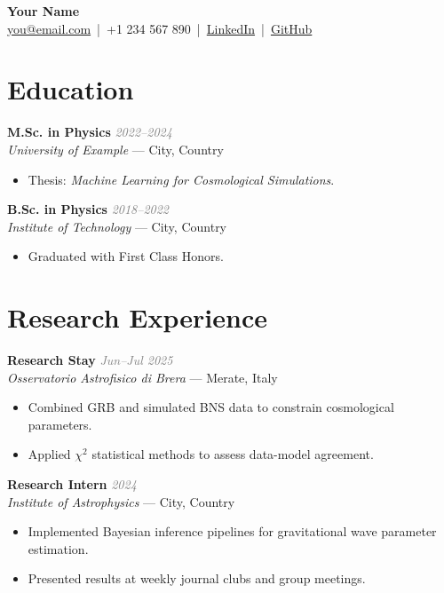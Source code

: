 \documentclass[a4paper,11pt]{article}
\newcommand{\dated}[1]{\textcolor{gray}{\textit{#1}}}
\newcommand{\resumeSubheading}[4]{
  \vspace{1pt}\textbf{#1} \hfill \dated{#2} \\
  \textit{#3} --- #4 \vspace{2pt}
}
\newenvironment{resumeItemList}{\begin{itemize}[leftmargin=*]}{\end{itemize}}
\begin{document}
\begin{center}
  {\Huge \textbf{Your Name}} \\[4pt]
  \href{mailto:you@email.com}{you@email.com} \,|\, 
  +1 234 567 890 \,|\, 
  \href{https://linkedin.com/in/username}{LinkedIn} \,|\, 
  \href{https://github.com/username}{GitHub} \\
\end{center}

\section{Education}
\resumeSubheading{M.Sc. in Physics}{2022--2024}{University of Example}{City, Country}
\begin{resumeItemList}
  \item Thesis: \emph{Machine Learning for Cosmological Simulations}.
\end{resumeItemList}

\resumeSubheading{B.Sc. in Physics}{2018--2022}{Institute of Technology}{City, Country}
\begin{resumeItemList}
  \item Graduated with First Class Honors.
\end{resumeItemList}

\section{Research Experience}
\resumeSubheading{Research Stay}{Jun--Jul 2025}{Osservatorio Astrofisico di Brera}{Merate, Italy}
\begin{resumeItemList}
  \item Combined GRB and simulated BNS data to constrain cosmological parameters.
  \item Applied $\chi^2$ statistical methods to assess data-model agreement.
\end{resumeItemList}

\resumeSubheading{Research Intern}{2024}{Institute of Astrophysics}{City, Country}
\begin{resumeItemList}
  \item Implemented Bayesian inference pipelines for gravitational wave parameter estimation.
  \item Presented results at weekly journal clubs and group meetings.
\end{resumeItemList}
\end{document}
